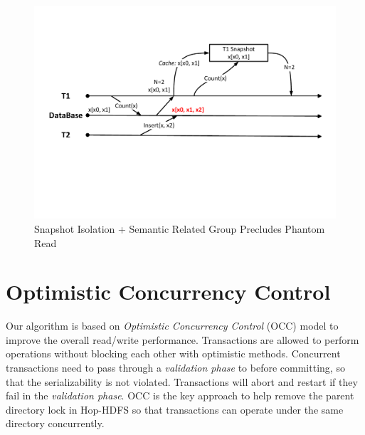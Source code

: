 \begin{itemize}[noitemsep]
	\begin{figure}[h]
		\centering
		\includegraphics[width=\linewidth]{figs/snapphantom.pdf}
		\caption{Snapshot Isolation + Semantic Related Group Precludes Phantom Read}
		\label{fig:snapphantom}
	\end{figure}
	
\end{itemize} 
\section{Optimistic Concurrency Control}

Our algorithm is based on \textit{Optimistic Concurrency Control} (OCC) model to improve the overall read/write performance. Transactions are allowed to perform operations without blocking each other with optimistic methods. Concurrent transactions need to pass through a \textit{validation phase} to before committing, so that the serializability is not violated. Transactions will abort and restart if they fail in the \textit{validation phase}. OCC is the key approach to help remove the parent directory lock in Hop-HDFS so that transactions can operate under the same directory concurrently.

